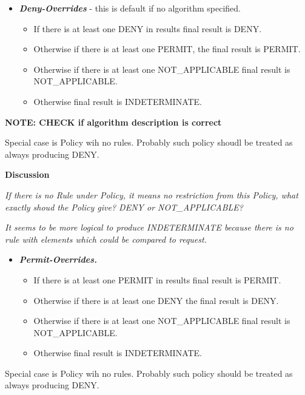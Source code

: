 \documentclass{article}
\newcommand\liststyleWWviiiNumxxi{%
\renewcommand\labelitemi{[F0B7?]}
\renewcommand\labelitemii{o}
\renewcommand\labelitemiii{[F0A7?]}
\renewcommand\labelitemiv{[F0B7?]}
}
\begin{document}
\liststyleWWviiiNumxxi
\begin{itemize}
\item {\color{black}
\textbf{\textit{Deny-Overrides}} - this is default if no algorithm
specified.}

\begin{itemize}
\item {\color{black}
If there is at least one DENY in results final result is DENY.}
\item {\color{black}
Otherwise if there is at least one PERMIT, the final result is PERMIT.}
\item {\color{black}
Otherwise if there is at least one NOT\_APPLICABLE final result is
NOT\_APPLICABLE.}
\item {\color{black}
Otherwise final result is INDETERMINATE.}
\end{itemize}
\end{itemize}
{\upshape\color{black}
\textbf{NOTE}\textbf{: CHECK if algorithm description is correct}}

{\color{black}
Special case is Policy wih no rules. Probably such policy shoudl be
treated as always producing DENY.}

{\bfseries\color{black}
Discussion}

{\itshape\color{black}
If there is no Rule under Policy, it means no restriction from this
Policy, what exactly shoud the Policy give? DENY or NOT\_APPLICABLE?}

{\itshape\color{black}
It seems to be more logical to produce INDETERMINATE because there is no
rule with elements which could be compared to request.}

\liststyleWWviiiNumxxi
\begin{itemize}
\item {\bfseries\itshape\color{black}
Permit-Overrides.}

\begin{itemize}
\item {\color{black}
If there is at least one PERMIT in results final result is PERMIT.}
\item {\color{black}
Otherwise if there is at least one DENY the final result is DENY.}
\item {\color{black}
Otherwise if there is at least one NOT\_APPLICABLE final result is
NOT\_APPLICABLE.}
\item {\color{black}
Otherwise final result is INDETERMINATE.}
\end{itemize}
\end{itemize}
{\color{black}
Special case is Policy wih no rules. Probably such policy should be
treated as always producing DENY.}
\end{document}
